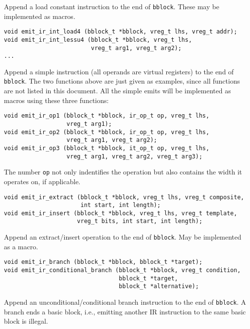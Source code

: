 \documentclass{article}
\newcommand{\cc}[1]{\texttt{#1}} %
\begin{document}
Append a load constant instruction to the end of \cc{bblock}.  These
may be implemented as macros.

\begin{verbatim}
void emit_ir_int_load4 (bblock_t *bblock, vreg_t lhs, vreg_t addr);
void emit_ir_int_lessu4 (bblock_t *bblock, vreg_t lhs,
                         vreg_t arg1, vreg_t arg2);
...
\end{verbatim}

Append a simple instruction (all operands are virtual registers) to
the end of \cc{bblock}.  The two functions above are just given as
examples, since all functions are not listed in this document.  All
the simple emits will be implemented as macros using these three
functions:

\begin{verbatim}
void emit_ir_op1 (bblock_t *bblock, ir_op_t op, vreg_t lhs,
                  vreg_t arg1);
void emit_ir_op2 (bblock_t *bblock, ir_op_t op, vreg_t lhs,
                  vreg_t arg1, vreg_t arg2);
void emit_ir_op3 (bblock_t *bblock, it_op_t op, vreg_t lhs,
                  vreg_t arg1, vreg_t arg2, vreg_t arg3);
\end{verbatim}

The number \cc{op} not only indentifies the operation but also
contains the width it operates on, if applicable.

\begin{verbatim}
void emit_ir_extract (bblock_t *bblock, vreg_t lhs, vreg_t composite,
                      int start, int length);
void emit_ir_insert (bblock_t *bblock, vreg_t lhs, vreg_t template,
                     vreg_t bits, int start, int length);
\end{verbatim}

Append an extract/insert operation to the end of \cc{bblock}.  May be
implemented as a macro.

\begin{verbatim}
void emit_ir_branch (bblock_t *bblock, bblock_t *target);
void emit_ir_conditional_branch (bblock_t *bblock, vreg_t condition,
                                 bblock_t *target,
                                 bblock_t *alternative);
\end{verbatim}

Append an unconditional/conditional branch instruction to the end of
\cc{bblock}.  A branch ends a basic block, i.e., emitting another IR
instruction to the same basic block is illegal.
\end{document}
